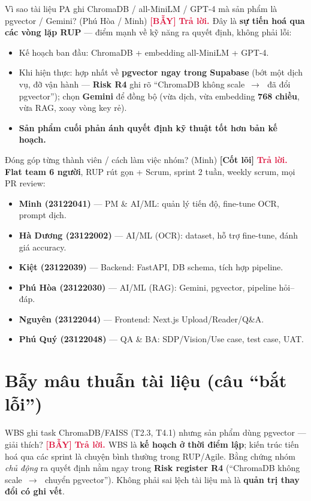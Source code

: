 \documentclass[11pt]{article}
\newcommand{\arr}{\,\ensuremath{\rightarrow}\,}
\newcommand{\tagCore}{\textcolor{steel}{\footnotesize\textbf{[Cốt lõi]}}}
\newcommand{\tagTrap}{\textcolor{crimson}{\footnotesize\textbf{[BẪY]}}}
\newcommand{\A}{\textbf{\textcolor{crimson}{Trả lời. }}}
\begin{document}
\begin{qa}{Vì sao tài liệu PA ghi ChromaDB / all-MiniLM / GPT-4 mà sản phẩm là pgvector / Gemini? (Phú Hòa / Minh) \tagTrap}
\A Đây là \textbf{sự tiến hoá qua các vòng lặp RUP} --- điểm mạnh về kỹ năng ra quyết định, không phải lỗi:
\begin{itemize}
  \item Kế hoạch ban đầu: ChromaDB + embedding all-MiniLM + GPT-4.
  \item Khi hiện thực: hợp nhất về \textbf{pgvector ngay trong Supabase} (bớt một dịch vụ, đỡ vận hành --- \textbf{Risk R4} ghi rõ ``ChromaDB không scale \arr\ đã đổi pgvector''); chọn \textbf{Gemini} để đồng bộ (vừa dịch, vừa embedding \textbf{768 chiều}, vừa RAG, xoay vòng key rẻ).
  \item \textbf{Sản phẩm cuối phản ánh quyết định kỹ thuật tốt hơn bản kế hoạch.}
\end{itemize}
\end{qa}

\begin{qa}{Đóng góp từng thành viên / cách làm việc nhóm? (Minh) \tagCore}
\A \textbf{Flat team 6 người}, RUP rút gọn + Scrum, sprint 2 tuần, weekly scrum, mọi PR review:
\begin{itemize}
  \item \textbf{Minh (23122041)} --- PM \& AI/ML: quản lý tiến độ, fine-tune OCR, prompt dịch.
  \item \textbf{Hà Dương (23122002)} --- AI/ML (OCR): dataset, hỗ trợ fine-tune, đánh giá accuracy.
  \item \textbf{Kiệt (23122039)} --- Backend: FastAPI, DB schema, tích hợp pipeline.
  \item \textbf{Phú Hòa (23122030)} --- AI/ML (RAG): Gemini, pgvector, pipeline hỏi--đáp.
  \item \textbf{Nguyên (23122044)} --- Frontend: Next.js Upload/Reader/Q\&A.
  \item \textbf{Phú Quý (23122048)} --- QA \& BA: SDP/Vision/Use case, test case, UAT.
\end{itemize}
\end{qa}

\section{Bẫy mâu thuẫn tài liệu (câu ``bắt lỗi'')}

\begin{qa}{WBS ghi task ChromaDB/FAISS (T2.3, T4.1) nhưng sản phẩm dùng pgvector --- giải thích? \tagTrap}
\A WBS là \textbf{kế hoạch ở thời điểm lập}; kiến trúc tiến hoá qua các sprint là chuyện bình thường trong RUP/Agile. Bằng chứng nhóm \textit{chủ động} ra quyết định nằm ngay trong \textbf{Risk register R4} (``ChromaDB không scale \arr\ chuyển pgvector''). Không phải sai lệch tài liệu mà là \textbf{quản trị thay đổi có ghi vết}.
\end{qa}
\end{document}
